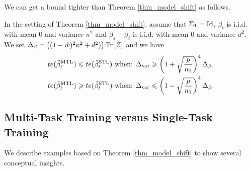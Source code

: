 	We can get a bound tighter than Theorem \ref{thm_model_shift} as follows.

	\begin{proposition}\label{prop_model_shift_tight}
		In the setting of Theorem \ref{thm_model_shift}, assume that $\Sigma_1 =\operatorname{Id}$,
		$\beta_t$ is i.i.d. with mean $0$ and variance $\kappa^2$ and $\beta_s - \beta_t$ is i.i.d. with mean $0$ and variance $d^2$.
		We set $\Delta_{\beta} = \left({(1 - \hat{w})^2 \kappa^2 + d^2)}\right) \operatorname{Tr}\left[Z\right]$
		and we have
		\begin{align*}
			te(\hat{\beta}_t^{\text{MTL}}) \leqslant te(\hat{\beta}_t^{\text{STL}}) \text{ when: } & \Delta_{\text{var}} \geqslant \left({1 + \sqrt{\frac{p}{n_1}}}\right)^4 \Delta_{\beta}, \\
			te(\hat{\beta}_t^{\text{MTL}}) \geqslant te(\hat{\beta}_t^{\text{STL}}) \text{ when: } & \Delta_{\text{var}} \leqslant \left({1 - \sqrt{\frac{p}{n_1}}}\right)^4 \Delta_{\beta}.
		\end{align*}
	\end{proposition}

\subsection{Multi-Task Training versus Single-Task Training}


We describe examples based on Theorem \ref{thm_model_shift} to show several conceptual insights.

